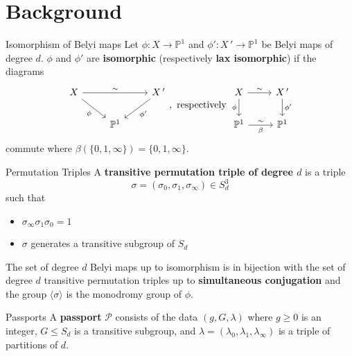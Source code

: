 \documentclass[xcolor=dvipsnames,handout]{beamer}
\theoremstyle{plain}
\newcommand{\PP}{\mathbb P}
\begin{document}
  \section{Background}{
    \begin{frame}[fragile]{Isomorphism of Belyi maps}
      Let $\phi\colon X\to\PP^1$
      and
      $\phi'\colon X\,'\to\PP^1$
      be Belyi maps of degree $d$.
      \pause\newline
      $\phi$ and $\phi'$ are
      \textbf{isomorphic}
      (respectively \textbf{lax isomorphic})
      if the diagrams
      \[
        \begin{tikzcd}
          X\arrow{rr}{\sim}\arrow{dr}[swap]{\phi}
          &
          &X\,'\arrow{dl}{\phi'}\\
          &\PP^1
        \end{tikzcd},
        \text{ respectively }
        \begin{tikzcd}
          X\arrow{r}{\sim}\arrow{d}[swap]{\phi}&X\,'\arrow{d}{\phi'}\\
          \PP^1\arrow{r}{\sim}[swap]{\beta}&\PP^1
        \end{tikzcd}
      \]
      commute
      where $\beta(\{0,1,\infty\}) = \{0,1,\infty\}$.
    \end{frame}
    \begin{frame}{Permutation Triples}
      A \textbf{transitive permutation triple of degree $d$} is a triple
      \[
        \sigma = (\sigma_0, \sigma_1, \sigma_\infty)\in S_d^3
      \]
      such that
      \begin{itemize}
        \item
          $\sigma_\infty\sigma_1\sigma_0=1$
        \item
          $\sigma$ generates a transitive subgroup of $S_d$
      \end{itemize}
      \pause
      The set of degree $d$ Belyi maps up to isomorphism is in bijection with the
      set of degree $d$ transitive permutation triples up to
      \textbf{simultaneous conjugation} and
      the group $\langle\sigma\rangle$ is the monodromy group of $\phi$.
    \end{frame}
    \begin{frame}{Passports}
      A \textbf{passport} $\mathcal{P}$ consists of the data
      $(g,G,\lambda)$ where $g\geq 0$ is an integer,
      $G\leq S_d$ is a transitive subgroup,
      and $\lambda = (\lambda_0,\lambda_1,\lambda_\infty)$
      is a triple of partitions of $d$.
      \pause
      \par

\end{frame}}
\end{document}

